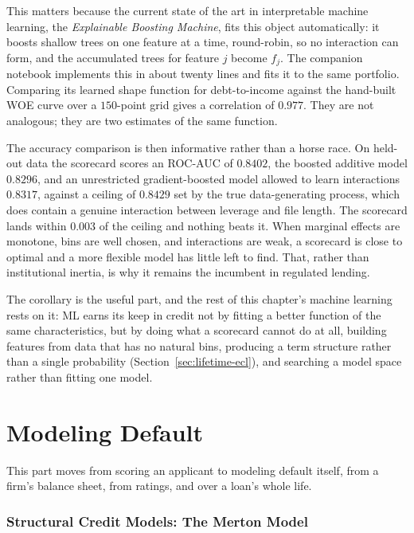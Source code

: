 \documentclass[../ai_in_finance]{subfiles}
\begin{document}
This matters because the current state of the art in interpretable machine learning, the \emph{Explainable Boosting Machine}, fits this object automatically: it boosts shallow trees on one feature at a time, round-robin, so no interaction can form, and the accumulated trees for feature $j$ become $f_j$. The companion notebook implements this in about twenty lines and fits it to the same portfolio. Comparing its learned shape function for debt-to-income against the hand-built WOE curve over a $150$-point grid gives a correlation of $0.977$. They are not analogous; they are two estimates of the same function.

The accuracy comparison is then informative rather than a horse race. On held-out data the scorecard scores an ROC-AUC of $0.8402$, the boosted additive model $0.8296$, and an unrestricted gradient-boosted model allowed to learn interactions $0.8317$, against a ceiling of $0.8429$ set by the true data-generating process, which does contain a genuine interaction between leverage and file length. The scorecard lands within $0.003$ of the ceiling and nothing beats it. When marginal effects are monotone, bins are well chosen, and interactions are weak, a scorecard is close to optimal and a more flexible model has little left to find. That, rather than institutional inertia, is why it remains the incumbent in regulated lending.

The corollary is the useful part, and the rest of this chapter's machine learning rests on it: ML earns its keep in credit not by fitting a better function of the same characteristics, but by doing what a scorecard cannot do at all, building features from data that has no natural bins, producing a term structure rather than a single probability (Section~\ref{sec:lifetime-ecl}), and searching a model space rather than fitting one model.

\section{Modeling Default}

This part moves from scoring an applicant to modeling default itself, from a firm's balance sheet, from ratings, and over a loan's whole life.

\subsubsection*{Structural Credit Models: The Merton Model}
\label{sec:merton-model}
\end{document}
